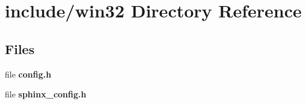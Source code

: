 \section{include/win32 Directory Reference}
\label{dir_626e1d022ece4ed819c63798cf035138}
\subsection*{Files}
\begin{DoxyCompactItemize}
\item 
file {\bfseries config.\+h}
\item 
file {\bfseries sphinx\+\_\+config.\+h}
\end{DoxyCompactItemize}
